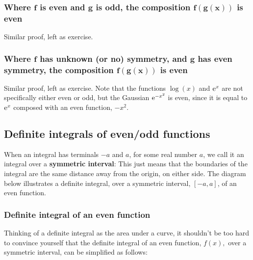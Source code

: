 \subsubsection{Where $\boldsymbol{f}$ is even and $\boldsymbol{g}$ is odd, the composition $\boldsymbol{f(g(x))}$ is even}
Similar proof, left as exercise.
\subsubsection{Where $\boldsymbol{f}$ has unknown (or no) symmetry, and $\boldsymbol{g}$ has even symmetry, the composition $\boldsymbol{f(g(x))}$ is even} \label{proof20.1}
Similar proof, left as exercise. Note that the functions $\log(x)$ and $\mathrm{e}^x$ are not specifically either even or odd, but the Gaussian $\mathrm{e}^{-x^2}$ is even, since it is equal to $\mathrm{e}^{x}$ composed with an even function, $-x^2$.

\subsection{Definite integrals of even/odd functions} \label{symmetric interval}
When an integral has terminals $-a$ and $a$, for some real number $a$, we call it an integral over a \textbf{symmetric interval}: This just means that the boundaries of the integral are the same distance away from the origin, on either side. The diagram below illustrates a definite integral, over a symmetric interval, $[-a,a]$, of an even function.
\begin{center}
\end{center}
\subsubsection{Definite integral of an even function}
Thinking of a definite integral as the area under a curve, it shouldn't be too hard to convince yourself that the definite integral of an even function, $f(x),$ over a symmetric interval, can be simplified as follows:

